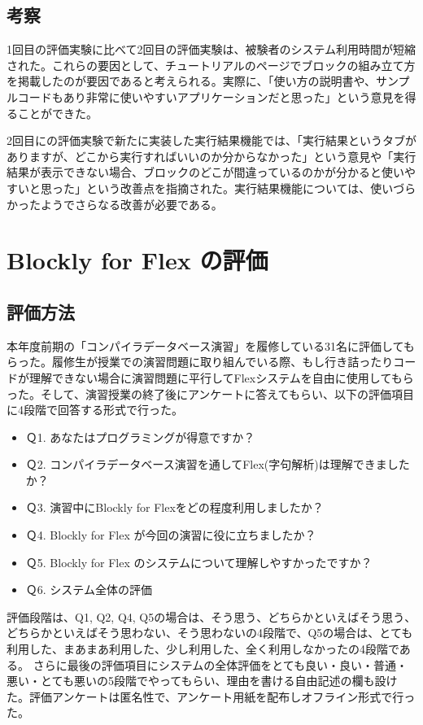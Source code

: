 \documentclass{risepaper}
\begin{document}
		\subsection{考察}
        
1回目の評価実験に比べて2回目の評価実験は、被験者のシステム利用時間が短縮された。これらの要因として、チュートリアルのページでブロックの組み立て方を掲載したのが要因であると考えられる。実際に、「使い方の説明書や、サンプルコードもあり非常に使いやすいアプリケーションだと思った」という意見を得ることができた。

2回目にの評価実験で新たに実装した実行結果機能では、「実行結果というタブがありますが、どこから実行すればいいのか分からなかった」という意見や「実行結果が表示できない場合、ブロックのどこが間違っているのかが分かると使いやすいと思った」という改善点を指摘された。実行結果機能については、使いづらかったようでさらなる改善が必要である。

   \section{Blockly for Flex の評価}
   
   		\subsection{評価方法}
        
本年度前期の「コンパイラデータベース演習」を履修している31名に評価してもらった。履修生が授業での演習問題に取り組んでいる際、もし行き詰ったりコードが理解できない場合に演習問題に平行してFlexシステムを自由に使用してもらった。そして、演習授業の終了後にアンケートに答えてもらい、以下の評価項目に4段階で回答する形式で行った。
\begin{itemize}
\item Ｑ1. あなたはプログラミングが得意ですか？
\item Ｑ2. コンパイラデータベース演習を通してFlex(字句解析)は理解できましたか？
\item Ｑ3. 演習中にBlockly for Flexをどの程度利用しましたか？
\item Ｑ4. Blockly for Flex が今回の演習に役に立ちましたか？
\item Ｑ5. Blockly for Flex のシステムについて理解しやすかったですか？
\item Ｑ6. システム全体の評価
\end{itemize} 
評価段階は、Q1, Q2, Q4, Q5の場合は、そう思う、どちらかといえばそう思う、どちらかといえばそう思わない、そう思わないの4段階で、Q5の場合は、とても利用した、まあまあ利用した、少し利用した、全く利用しなかったの4段階である。
さらに最後の評価項目にシステムの全体評価をとても良い・良い・普通・悪い・とても悪いの5段階でやってもらい、理由を書ける自由記述の欄も設けた。評価アンケートは匿名性で、アンケート用紙を配布しオフライン形式で行った。
\end{document}
